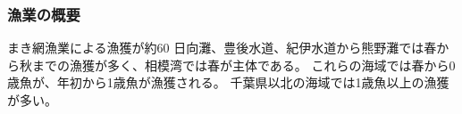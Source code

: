 \subsubsection{漁業の概要} 
まき網漁業による漁獲が約60%
日向灘、豊後水道、紀伊水道から熊野灘では春から秋までの漁獲が多く、相模湾では春が主体である。
これらの海域では春から0歳魚が、年初から1歳魚が漁獲される。
千葉県以北の海域では1歳魚以上の漁獲が多い。

